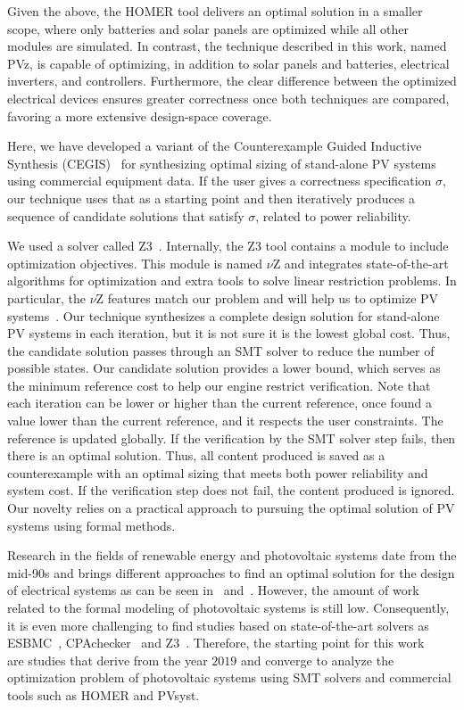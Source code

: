 \documentclass[journal]{IEEEtran}
\begin{document}
Given the above, the HOMER tool delivers an optimal solution in a smaller scope, where only batteries and solar panels are optimized while all other modules are simulated. In contrast, the technique described in this work, named PVz, is capable of optimizing, in addition to solar panels and batteries, electrical inverters, and controllers. Furthermore, the clear difference between the optimized electrical devices ensures greater correctness once both techniques are compared, favoring a more extensive design-space coverage.

Here, we have developed a variant of the Counterexample Guided Inductive Synthesis (CEGIS)~\cite{AbateCAV2018} for synthesizing optimal sizing of stand-alone PV systems using commercial equipment data. If the user gives a correctness specification $\sigma$, our technique uses that as a starting point and then iteratively produces a sequence of candidate solutions that satisfy $\sigma$, related to power reliability.

We used a solver called Z3~\cite{BjornerPF15}. Internally, the Z3 tool contains a module to include optimization objectives. This module is named $\nu$Z and integrates state-of-the-art algorithms for optimization and extra tools to solve linear restriction problems. In particular, the $\nu$Z features match our problem and will help us to optimize PV systems~\cite{BjornerPF15}. Our technique synthesizes a complete design solution for stand-alone PV systems in each iteration, but it is not sure it is the lowest global cost. Thus, the candidate solution passes through an SMT solver to reduce the number of possible states. Our candidate solution provides a lower bound, which serves as the minimum reference cost to help our engine restrict verification. Note that each iteration can be lower or higher than the current reference, once found a value lower than the current reference, and it respects the user constraints. The reference is updated globally. If the verification by the SMT solver step fails, then there is an optimal solution. Thus, all content produced is saved as a counterexample with an optimal sizing that meets both power reliability and system cost. If the verification step does not fail, the content produced is ignored. Our novelty relies on a practical approach to pursuing the optimal solution of PV systems using formal methods. 
 

Research in the fields of renewable energy and photovoltaic systems date from the mid-90s and brings different approaches to find an optimal solution for the design of electrical systems as can be seen in~\cite{Driouich2018} and~\cite{Applasamy2011}. However, the amount of work related to the formal modeling of photovoltaic systems is still low. Consequently, it is even more challenging to find studies based on state-of-the-art solvers as ESBMC~\cite{esbmc2018}, CPAchecker~\cite{Beyer2011} and Z3~\cite{BjornerPF15}. Therefore, the starting point for this work~\cite{VSTTE2020}~\cite{TrindadeCordeiro19}~\cite{AraujoBCF16} are studies that derive from the year $2019$ and converge to analyze the optimization problem of photovoltaic systems using SMT solvers and commercial tools such as HOMER and PVsyst. 
 
\end{document}
